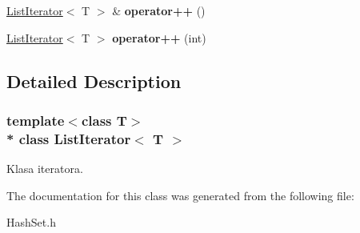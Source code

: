 \begin{DoxyCompactItemize}
\item 
\hyperlink{class_list_iterator}{List\+Iterator}$<$ T $>$ \& {\bfseries operator++} ()\hypertarget{class_list_iterator_a94a526e4c3ff9f394ef3f8f4c771d804}{}\label{class_list_iterator_a94a526e4c3ff9f394ef3f8f4c771d804}

\item 
\hyperlink{class_list_iterator}{List\+Iterator}$<$ T $>$ {\bfseries operator++} (int)\hypertarget{class_list_iterator_a4811021894f4072d7b1723469822c820}{}\label{class_list_iterator_a4811021894f4072d7b1723469822c820}

\end{DoxyCompactItemize}


\subsection{Detailed Description}
\subsubsection*{template$<$class T$>$\\*
class List\+Iterator$<$ T $>$}

Klasa iteratora. 

The documentation for this class was generated from the following file\+:\begin{DoxyCompactItemize}
\item 
Hash\+Set.\+h\end{DoxyCompactItemize}
